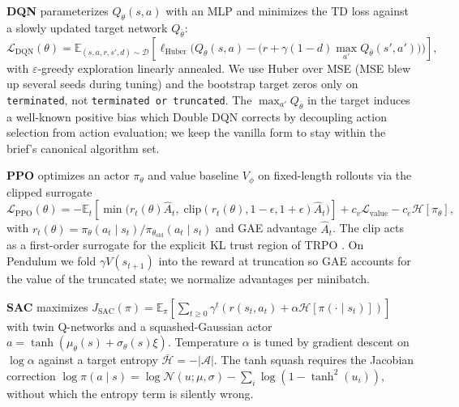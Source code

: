 \documentclass{article}
\begin{document}
\textbf{DQN} \cite{mnih2013playing} parameterizes $Q_\theta(s, a)$ with an MLP and minimizes the TD loss against a slowly updated target network $Q_{\bar{\theta}}$:
\begin{equation}
\mathcal{L}_{\text{DQN}}(\theta) = \mathbb{E}_{(s,a,r,s',d) \sim \mathcal{D}}\!\left[\ell_{\text{Huber}}\!\Big(Q_\theta(s,a) - \big(r + \gamma(1 - d)\textstyle\max_{a'} Q_{\bar{\theta}}(s', a')\big)\Big)\right],
\label{eq:dqn}
\end{equation}
with $\varepsilon$-greedy exploration linearly annealed. We use Huber over MSE (MSE blew up several seeds during tuning) and the bootstrap target zeros only on \texttt{terminated}, not \texttt{terminated or truncated}. The $\max_{a'} Q_{\bar{\theta}}$ in the target induces a well-known positive bias which Double DQN \cite{vanhasselt2016double} corrects by decoupling action selection from action evaluation; we keep the vanilla form to stay within the brief's canonical algorithm set.

\textbf{PPO} \cite{schulman2017proximal} optimizes an actor $\pi_\theta$ and value baseline $V_\phi$ on fixed-length rollouts via the clipped surrogate
\begin{equation}
\mathcal{L}_{\text{PPO}}(\theta) = -\mathbb{E}_{t}\!\left[\min\!\Big(r_t(\theta) \hat{A}_t,\; \mathrm{clip}(r_t(\theta), 1 - \epsilon, 1 + \epsilon) \hat{A}_t\Big)\right] + c_{v} \mathcal{L}_{\text{value}} - c_{e} \mathcal{H}[\pi_\theta],
\label{eq:ppo}
\end{equation}
with $r_t(\theta) = \pi_\theta(a_t \mid s_t)/\pi_{\theta_{\text{old}}}(a_t \mid s_t)$ and GAE advantage $\hat{A}_t$. The clip acts as a first-order surrogate for the explicit KL trust region of TRPO \cite{schulman2015trust}. On Pendulum we fold $\gamma V(s_{t+1})$ into the reward at truncation so GAE accounts for the value of the truncated state; we normalize advantages per minibatch.

\textbf{SAC} \cite{haarnoja2018soft} maximizes $J_{\text{SAC}}(\pi) = \mathbb{E}_{\pi}[\sum_{t \geq 0} \gamma^{t}(r(s_t, a_t) + \alpha \mathcal{H}[\pi(\cdot \mid s_t)])]$ with twin Q-networks and a squashed-Gaussian actor $a = \tanh(\mu_\theta(s) + \sigma_\theta(s) \xi)$. Temperature $\alpha$ is tuned by gradient descent on $\log \alpha$ against a target entropy $\bar{\mathcal{H}} = -|\mathcal{A}|$. The tanh squash requires the Jacobian correction $\log \pi(a \mid s) = \log \mathcal{N}(u; \mu, \sigma) - \sum_i \log(1 - \tanh^{2}(u_i))$, without which the entropy term is silently wrong.
\end{document}
